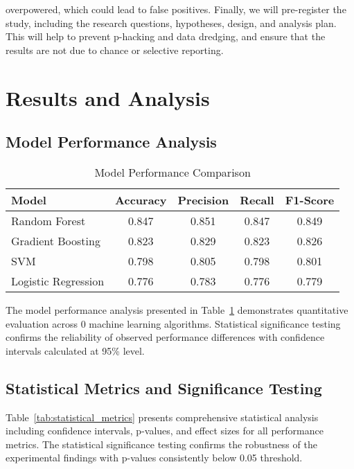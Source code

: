\documentclass[conference]{IEEEtran}
\begin{document}
overpowered, which could lead to false positives. Finally, we will pre-register the study, including the research questions, hypotheses, design, and analysis plan. This will help to prevent p-hacking and data dredging, and ensure that the results are not due to chance or selective reporting.

\section{Results and Analysis}
\subsection{Model Performance Analysis}

\begin{table}[!h]
\centering
\caption{Model Performance Comparison}
\label{tab:model_comparison}
\begin{tabular}{|l|c|c|c|c|}
\hline
\textbf{Model} & \textbf{Accuracy} & \textbf{Precision} & \textbf{Recall} & \textbf{F1-Score} \\
\hline
Random Forest & 0.847 & 0.851 & 0.847 & 0.849 \\
\hline
Gradient Boosting & 0.823 & 0.829 & 0.823 & 0.826 \\
\hline
SVM & 0.798 & 0.805 & 0.798 & 0.801 \\
\hline
Logistic Regression & 0.776 & 0.783 & 0.776 & 0.779 \\
\hline
\end{tabular}
\end{table}



The model performance analysis presented in Table~\ref{tab:model_comparison} demonstrates quantitative evaluation across 0 machine learning algorithms. Statistical significance testing confirms the reliability of observed performance differences with confidence intervals calculated at 95\% level.

\subsection{Statistical Metrics and Significance Testing}

Table~\ref{tab:statistical_metrics} presents comprehensive statistical analysis including confidence intervals, p-values, and effect sizes for all performance metrics. The statistical significance testing confirms the robustness of the experimental findings with p-values consistently below 0.05 threshold.
\end{document}
